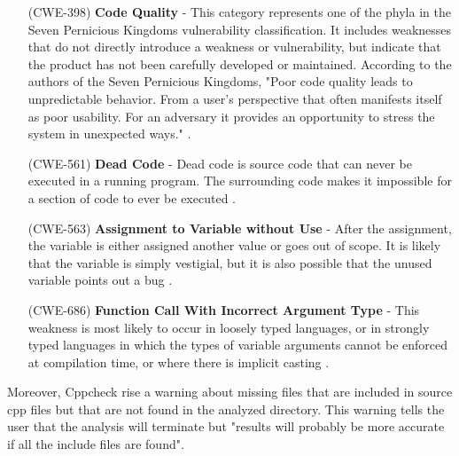 \begin{itemize}
	\item[(CWE-398) ] \textbf{Code Quality} - This category represents one of the phyla in the Seven Pernicious Kingdoms vulnerability classification. It includes weaknesses that do not directly introduce a weakness or vulnerability, but indicate that the product has not been carefully developed or maintained. According to the authors of the Seven Pernicious Kingdoms, "Poor code quality leads to unpredictable behavior. From a user's perspective that often manifests itself as poor usability. For an adversary it provides an opportunity to stress the system in unexpected ways." \cite{bibitem3}.
	\item[(CWE-561) ] \textbf{Dead Code} - Dead code is source code that can never be executed in a running program. The surrounding code makes it impossible for a section of code to ever be executed \cite{bibitem4}.
	\item[(CWE-563) ] \textbf{Assignment to Variable without Use} - After the assignment, the variable is either assigned another value or goes out of scope. It is likely that the variable is simply vestigial, but it is also possible that the unused variable points out a bug \cite{bibitem5}. 
	\item[(CWE-686) ] \textbf{Function Call With Incorrect Argument Type} - This weakness is most likely to occur in loosely typed languages, or in strongly typed languages in which the types of variable arguments cannot be enforced at compilation time, or where there is implicit casting \cite{bibitem6}.
\end{itemize}

Moreover, Cppcheck rise a warning about missing files that are included in source cpp files but that are not found in the analyzed directory.\newline
This warning tells the user that the analysis will terminate but "results will probably be more accurate if all the include files are found".\newline\newline

